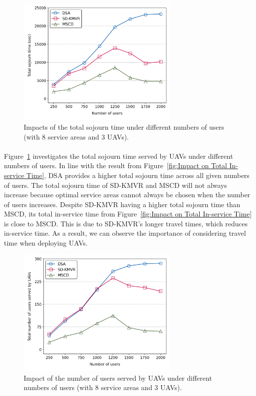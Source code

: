\documentclass[a4paper,12pt]{report}
\begin{document}
\begin{figure} [h!]
    \centering
    \includegraphics[width=0.7\textwidth]{Figure 7.png}
    \caption{Impacts of the total sojourn time under different numbers of users (with 8 service areas and 3 UAVs).}
    \label{fig:Impact on total sojourn time}
\end{figure}
\paragraph{}
Figure~\ref{fig:Impact on total sojourn time} investigates the total sojourn time served by UAVs under different numbers of users. In line with the result from Figure~\ref{fig:Impact on Total In-service Time}, DSA provides a higher total sojourn time across all given numbers of users. The total sojourn time of SD-KMVR and MSCD will not always increase because optimal service areas cannot always be chosen when the number of users increases. Despite SD-KMVR having a higher total sojourn time than MSCD, its total in-service time from Figure~\ref{fig:Impact on Total In-service Time} is close to MSCD. This is due to SD-KMVR's longer travel times, which reduces in-service time. As a result, we can observe the importance of considering travel time when deploying UAVs.

\begin{figure} [h!]
    \centering
    \includegraphics[width=0.7\textwidth]{Figure 8.png}
    \caption{Impact of the number of users served by UAVs under different numbers of users (with 8 service areas and 3 UAVs).}
    \label{fig:Impact on Number of Users Served by UAV}
\end{figure}
\end{document}
